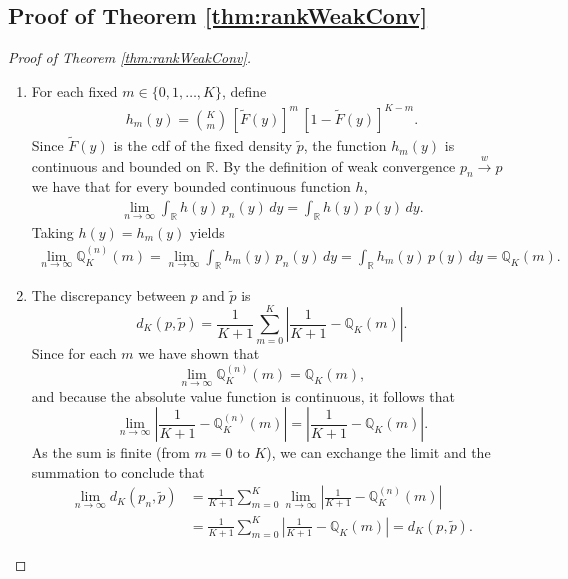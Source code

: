 \documentclass{article}
\begin{document}
\subsection{Proof of Theorem \ref{thm:rankWeakConv}}
\begin{proof}[Proof of Theorem \ref{thm:rankWeakConv}]
  \smallskip           %
  \noindent
\begin{enumerate}[label=(\roman*)]
\item For each fixed \(m \in \{0,1,\dots,K\}\), define
\begin{align*}
h_{m}(y)=\binom{K}{m}\,[\tilde{F}(y)]^m\,[1-\tilde{F}(y)]^{K-m}.
\end{align*}
Since \(\tilde{F}(y)\) is the cdf of the fixed density \(\tilde{p}\), the function \(h_{m}(y)\) is continuous and bounded on $\mathbb{R}$. By the definition of weak convergence $p_n \overset{w}{\longrightarrow} p$ we have that for every bounded continuous function $h$,
\begin{align*}
\lim_{n\to\infty}\int_{\mathbb{R}} h(y)\,p_n(y)\,dy = \int_{\mathbb{R}} h(y)\,p(y)\,dy.
\end{align*}
Taking \(h(y)=h_{m}(y)\) yields
\begin{align*}
\lim_{n\to\infty}\mathbb{Q}_K^{(n)}(m) = \lim_{n\to\infty}\int_{\mathbb{R}} h_m(y)\,p_n(y)\,dy = \int_{\mathbb{R}} h_m(y)\,p(y)\,dy = \mathbb{Q}_K(m).
\end{align*}
\item The discrepancy between $p$ and $\tilde{p}$ is
\[
d_K(p,\tilde{p}) = \frac{1}{K+1}\sum_{m=0}^{K}\left|\frac{1}{K+1} - \mathbb{Q}_K(m)\right|.
\]
Since for each \(m\) we have shown that
\[
\lim_{n\to\infty}\mathbb{Q}_K^{(n)}(m) = \mathbb{Q}_K(m),
\]
and because the absolute value function is continuous, it follows that
\[
\lim_{n\to\infty}\left|\frac{1}{K+1} - \mathbb{Q}_K^{(n)}(m)\right| = \left|\frac{1}{K+1} - \mathbb{Q}_K(m)\right|.
\]
As the sum is finite (from \(m=0\) to \(K\)), we can exchange the limit and the summation to conclude that
\begin{align*}
\lim_{n\to\infty} d_K(p_n,\tilde{p}) &= \frac{1}{K+1}\sum_{m=0}^{K}\lim_{n\to\infty}\left|\frac{1}{K+1} - \mathbb{Q}_K^{(n)}(m)\right| \\&= \frac{1}{K+1}\sum_{m=0}^{K}\left|\frac{1}{K+1} - \mathbb{Q}_K(m)\right| = d_K(p,\tilde{p}).
\end{align*}
\end{enumerate}
\end{proof}
\end{document}
